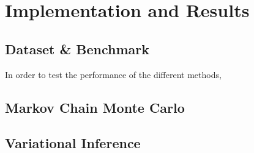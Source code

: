 \chapter{Implementation and Results}
\section{Dataset \& Benchmark}
In order to test the performance of the different methods,
\section{Markov Chain Monte Carlo}
\section{Variational Inference}